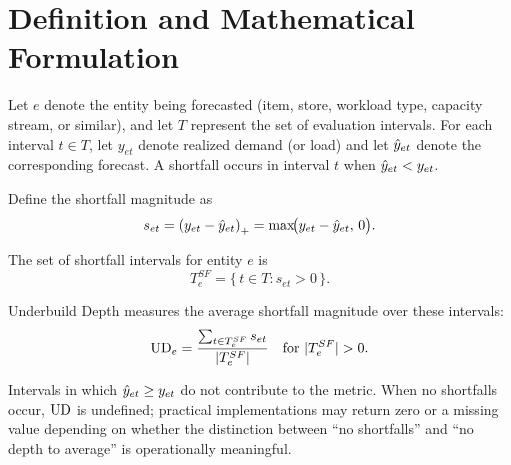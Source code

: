 \section{Definition and Mathematical Formulation}

Let $e$ denote the entity being forecasted (item, store, workload type, capacity
stream, or similar), and let $T$ represent the set of evaluation intervals. For each
interval $t \in T$, let $y_{et}$ denote realized demand (or load) and let
$\hat{y}_{et}$ denote the corresponding forecast. A shortfall occurs in interval $t$
when $\hat{y}_{et} < y_{et}$.

Define the shortfall magnitude as
\[
s_{et}
=
\left(y_{et} - \hat{y}_{et}\right)_{+}
=
\max\!\bigl(y_{et} - \hat{y}_{et},\, 0\bigr).
\]

The set of shortfall intervals for entity $e$ is
\[
T^{SF}_e
=
\{\, t \in T : s_{et} > 0 \,\}.
\]

Underbuild Depth measures the average shortfall magnitude over these intervals:
\[
\mathrm{UD}_e
=
\frac{\sum_{t \in T^{SF}_e} s_{et}}{|T^{SF}_e|}
\quad \text{for } |T^{SF}_e| > 0.
\]

Intervals in which $\hat{y}_{et} \ge y_{et}$ do not contribute to the metric. When no
shortfalls occur, $\mathrm{UD}$ is undefined; practical implementations may return zero or a
missing value depending on whether the distinction between ``no shortfalls'' and
``no depth to average'' is operationally meaningful.
